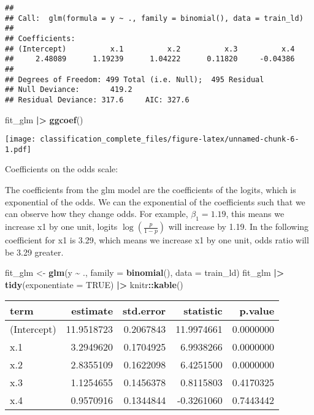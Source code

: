 \documentclass[
]{article}
\newenvironment{Shaded}{\begin{snugshade}}{\end{snugshade}}
\newcommand{\AttributeTok}[1]{\textcolor[rgb]{0.13,0.29,0.53}{#1}}
\newcommand{\ConstantTok}[1]{\textcolor[rgb]{0.56,0.35,0.01}{#1}}
\newcommand{\FunctionTok}[1]{\textcolor[rgb]{0.13,0.29,0.53}{\textbf{#1}}}
\newcommand{\NormalTok}[1]{#1}
\newcommand{\OtherTok}[1]{\textcolor[rgb]{0.56,0.35,0.01}{#1}}
\newcommand{\SpecialCharTok}[1]{\textcolor[rgb]{0.81,0.36,0.00}{\textbf{#1}}}
\begin{document}
\begin{verbatim}
## 
## Call:  glm(formula = y ~ ., family = binomial(), data = train_ld)
## 
## Coefficients:
## (Intercept)          x.1          x.2          x.3          x.4  
##     2.48089      1.19239      1.04222      0.11820     -0.04386  
## 
## Degrees of Freedom: 499 Total (i.e. Null);  495 Residual
## Null Deviance:       419.2 
## Residual Deviance: 317.6     AIC: 327.6
\end{verbatim}

\begin{Shaded}
\begin{Highlighting}[]
\NormalTok{fit\_glm }\SpecialCharTok{|\textgreater{}} \FunctionTok{ggcoef}\NormalTok{()}
\end{Highlighting}
\end{Shaded}

\texttt{[image: classification\_complete\_files/figure-latex/unnamed-chunk-6-1.pdf]}

Coefficients on the odds scale:

The coefficients from the glm model are the coefficients of the logits,
which is exponential of the odds. We can the exponential of the
coefficients such that we can observe how they change odds. For example,
\(\beta_1=1.19\), this means we increase x1 by one unit, logits
\(\log(\frac{p}{1-p})\) will increase by 1.19. In the following
coefficient for x1 is 3.29, which means we increase x1 by one unit, odds
ratio will be 3.29 greater.

\begin{Shaded}
\begin{Highlighting}[]
\NormalTok{fit\_glm }\OtherTok{\textless{}{-}} \FunctionTok{glm}\NormalTok{(y }\SpecialCharTok{\textasciitilde{}}\NormalTok{ ., }\AttributeTok{family =} \FunctionTok{binomial}\NormalTok{(), }\AttributeTok{data =}\NormalTok{ train\_ld)}
\NormalTok{fit\_glm }\SpecialCharTok{|\textgreater{}} 
  \FunctionTok{tidy}\NormalTok{(}\AttributeTok{exponentiate =} \ConstantTok{TRUE}\NormalTok{) }\SpecialCharTok{|\textgreater{}}\NormalTok{ knitr}\SpecialCharTok{::}\FunctionTok{kable}\NormalTok{()}
\end{Highlighting}
\end{Shaded}

\begin{longtable}[]{@{}lrrrr@{}}
\toprule\noalign{}
term & estimate & std.error & statistic & p.value \\
\midrule\noalign{}
\endhead
\bottomrule\noalign{}
\endlastfoot
(Intercept) & 11.9518723 & 0.2067843 & 11.9974661 & 0.0000000 \\
x.1 & 3.2949620 & 0.1704925 & 6.9938266 & 0.0000000 \\
x.2 & 2.8355109 & 0.1622098 & 6.4251500 & 0.0000000 \\
x.3 & 1.1254655 & 0.1456378 & 0.8115803 & 0.4170325 \\
x.4 & 0.9570916 & 0.1344844 & -0.3261060 & 0.7443442 \\
\end{longtable}
\end{document}
